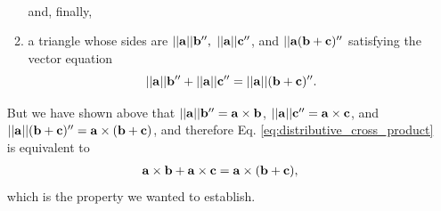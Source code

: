 \documentclass[12pt,letterpaper,reqno]{article}
\numberwithin{equation}{section}
\begin{document}
\begin{pf}
\begin{enumerate}[(1)]
\begin{enumerate}
\begin{align*}
	\end{align*}
	and, finally,
\item a triangle whose sides are $||{\bf a}||{\bf b}'',$ $||{\bf a}||{\bf c}''$, and $||{\bf a}({\bf b}+{\bf c})''$ satisfying the vector equation
	\begin{equation}\label{eq:distributive_cross_product}
		||{\bf a}||{\bf b}''+||{\bf a}||{\bf c}''=||{\bf a}||({\bf b}+{\bf c})''.
	\end{equation}
\end{enumerate}
But we have shown above that $||{\bf a}||{\bf b}''={\bf a} \times {\bf b}$, $||{\bf a}||{\bf c}''={\bf a} \times {\bf c}$, and $||{\bf a}||({\bf b}+{\bf c})''={\bf a} \times ({\bf b}+{\bf c})$,
and therefore Eq. \eqref{eq:distributive_cross_product} is equivalent to 
\begin{align*}
	{\bf a} \times {\bf b}+{\bf a} \times {\bf c}={\bf a} \times ({\bf b} + {\bf c}),
\end{align*}
which is the property we wanted to establish.
\end{enumerate}	
\end{pf}
\end{document}
